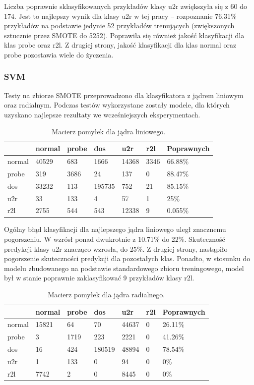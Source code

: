 \documentclass[a4paper, 12pt]{article}
\begin{document}
Liczba poprawnie sklasyfikowanych przykładów klasy u2r zwiększyła się z 60 do 174.
Jest to najlepszy wynik dla klasy u2r w tej pracy -- rozpoznanie 76.31\% przykładów
na podstawie jedynie 52 przykładów trenujących (zwiększonych sztucznie przez SMOTE do 5252).
Poprawiła się również jakość klasyfikacji dla klas probe oraz r2l. Z drugiej strony, jakość
klasyfikacji dla klas normal oraz probe pozostawia wiele do życzenia.

\subsubsection{SVM}
Testy na zbiorze SMOTE przeprowadzono dla klasyfikatora z jądrem liniowym oraz radialnym. Podczas testów wykorzystane zostały modele, dla których uzyskano najlepsze rezultaty we wcześniejszych eksperymentach.

\begin{table}[H]
\centering
\begin{tabular}{ | l | l | l | l | l | l | l | } \hline
	& normal & probe & dos 	& u2r 	& r2l 	& Poprawnych	\\ \hline
normal &  40529 &  683  & 1666 &  14368 & 3346 & 66.88\% \\ \hline
probe  &    319 &  3686 &     24  &   137 &    0 & 88.47\% \\ \hline
dos    &  33232 &   113 & 195735  &  752  &  21 & 85.15\% \\ \hline
u2r    &     33 &  133  &     4   &  57   &  1 & 25\% \\ \hline
r2l    &   2755 &   544 &    543 &  12338 &  9 & 0.055\% \\ \hline
\end{tabular} 
\caption{Macierz pomyłek dla jądra liniowego.}
\end{table}

Ogólny błąd klasyfikacji dla najlepszego jądra liniowego uległ znacznemu pogorszeniu. W wzrósł ponad dwukrotnie z 10.71\% do 22\%. Skuteczność predykcji klasy u2r znacząco wzrosła, do 25\%. Z drugiej strony, nastąpiło pogorszenie skuteczności predykcji dla pozostałych klas. Ponadto, w stosunku do modelu zbudowanego na podstawie standardowego zbioru treningowego, model był w stanie poprawnie zaklasyfikować 9 przykładów klasy r2l.

\begin{table}[H]
\centering
\begin{tabular}{ | l | l | l | l | l | l | l | } \hline
	& normal & probe & dos 	& u2r 	& r2l 	& Poprawnych	\\ \hline
normal & 15821 &   64  &   70 & 44637 &  0 & 26.11\% \\ \hline
probe  &    3 &  1719  &  223 &  2221 &  0  & 41.26\% \\ \hline
dos    &    16  & 424 & 180519 & 48894 & 0  & 78.54\% \\ \hline
u2r    &     1  & 133   &   0  &  94 &  0 & 0\% \\ \hline
r2l    &  7742  &   2  &   0 & 8445 &  0 & 0\% \\ \hline
\end{tabular} 
\caption{Macierz pomyłek dla jądra radialnego.}
\end{table}
\end{document}
